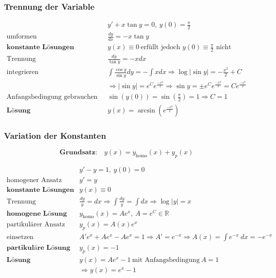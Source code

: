 \documentclass[11pt]{article}
\begin{document}
\subsubsection{Trennung der Variable}

\begin{equation*}
\begin{split}
	& y' + x \tan y = 0,\ y(0) = \frac{\pi}{2} \\
	\text{umformen}\quad & \frac{dy}{dx} = -x \tan y \\
	\textbf{konstante L{\"o}sungen}\quad & y(x) \equiv 0\ \text{erf{\"u}llt jedoch $y(0) \equiv \frac{\pi}{2}$ nicht} \\
	\text{Trennung}\quad & \frac{dy}{\tan y} = -x dx \\
	\text{integrieren}\quad & \int\frac{\cos y}{\sin y}dy = - \int xdx \Rightarrow \log|\sin y| = -\frac{x^2}{2} + C \\
	& \Rightarrow |\sin y| = e^Ce^{\frac{-x^2}{2}} \Rightarrow \sin y = \pm e^Ce^{\frac{-x^2}{2}} = Ce^{\frac{-x^2}{2}} \\
	\text{Anfangsbedingung gebrauchen}\quad & \sin(y(0)) = \sin (\frac{\pi}{2}) = 1 \Rightarrow C = 1 \\
	\textbf{L{\"o}sung}\quad & y(x) = \arcsin (e^{\frac{-x^2}{2}})
\end{split}
\end{equation*}

\subsubsection{Variation der Konstanten}

\begin{equation*}
	\textbf{Grundsatz:}\quad y(x) = y_\text{homo}(x) + y_p(x)
\end{equation*}

\begin{equation*}
\begin{split}
	& y' - y = 1,\ y(0) = 0 \\
	\text{homogener Ansatz}\quad & y' = y \\
	\textbf{konstante L{\"o}sungen}\quad & y(x) \equiv 0 \\
	\text{Trennung}\quad & \frac{dy}{y} = dx \Rightarrow \int\frac{dy}{y} = \int dx \Rightarrow \log|y| = x \\
	\textbf{homogene L{\"o}sung}\quad & y_\text{homo}(x) = Ae^x,\ A = e^C \in \mathbb{R} \\
	\text{partikul{\"a}rer Ansatz}\quad & y_p(x) = A(x)e^x \\
	\text{einsetzen}\quad & A'e^x + Ae^x - Ae^x = 1 \Rightarrow A' = e^{-x} \Rightarrow A(x) = \int e^{-x}\ dx = -e^{-x} \\
	\textbf{partikul{\"a}re L{\"o}sung}\quad & y_p(x) = -1 \\
	\textbf{L{\"o}sung}\quad & y(x) = Ae^x - 1\ \text{mit Anfangsbedingung}\ A = 1 \\
	& \Rightarrow y(x) = e^x - 1
\end{split}
\end{equation*}
\end{document}
